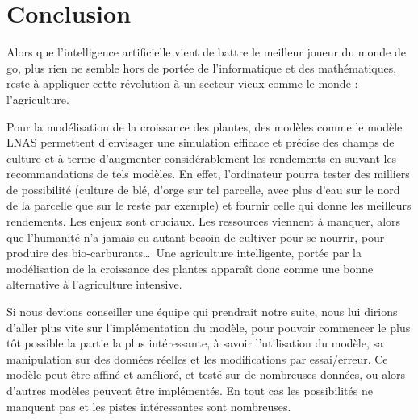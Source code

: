\section*{Conclusion}

Alors que l'intelligence artificielle vient de battre le meilleur joueur du monde de go, plus rien ne semble hors de portée de l'informatique et des mathématiques, reste à appliquer cette révolution à un secteur vieux comme le monde : l'agriculture.

Pour la modélisation de la croissance des plantes, des modèles comme le modèle LNAS permettent d'envisager une simulation efficace et précise des champs de culture et à terme d'augmenter considérablement les rendements en suivant les recommandations de tels modèles. En effet, l'ordinateur pourra tester des milliers de possibilité (culture de blé, d'orge sur tel parcelle, avec plus d'eau sur le nord de la parcelle que sur le reste par exemple) et fournir celle qui donne les meilleurs rendements. 
Les enjeux sont cruciaux. Les ressources viennent à manquer, alors que l'humanité n'a jamais eu autant besoin de cultiver pour se nourrir, pour produire des bio-carburants\dots ~Une agriculture intelligente, portée par la modélisation de la croissance des plantes apparaît donc comme une bonne alternative à l'agriculture intensive.


Si nous devions conseiller une équipe qui prendrait notre suite, nous lui dirions d'aller plus vite sur l'implémentation du modèle, pour pouvoir commencer le plus tôt possible la partie la plus intéressante, à savoir l'utilisation du modèle, sa manipulation sur des données réelles et les modifications par essai/erreur. Ce modèle peut être affiné et amélioré, et testé sur de nombreuses données, ou alors d'autres modèles peuvent être implémentés. En tout cas les possibilités ne manquent pas et les pistes intéressantes sont nombreuses.

